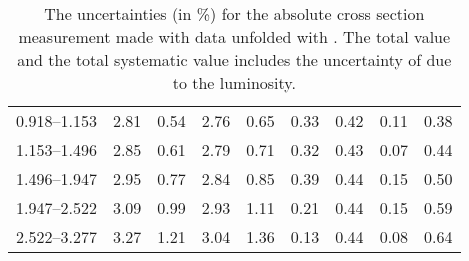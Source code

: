 \begin{table}
\begin{center}
{\begin{tabular}{@{}l l l l l l l l l@{}}
                0.918--1.153    &  2.81   &  0.54   &  2.76         &  0.65      &  0.33    &  0.42  &  0.11       &  0.38  \\
                1.153--1.496    &  2.85   &  0.61   &  2.79         &  0.71      &  0.32    &  0.43  &  0.07       &  0.44  \\
                1.496--1.947    &  2.95   &  0.77   &  2.84         &  0.85      &  0.39    &  0.44  &  0.15       &  0.50  \\
                1.947--2.522    &  3.09   &  0.99   &  2.93         &  1.11      &  0.21    &  0.44  &  0.15       &  0.59  \\
                2.522--3.277    &  3.27   &  1.21   &  3.04         &  1.36      &  0.13    &  0.44  &  0.08       &  0.64  \\
                \bottomrule
            \end{tabular}
        }
    \end{center}
    \caption[
        The uncertainties for the absolute cross section measurement made with
        data unfolded with \MADGRAPH.
    ]{
        The uncertainties (in \%) for the absolute cross section measurement
        made with data unfolded with \MADGRAPH. The total value and the total
        systematic value includes the uncertainty of \LumiUncertainty due to
        the luminosity.
    }
    \label{tab:sys_uncert_abs}
\end{table}
